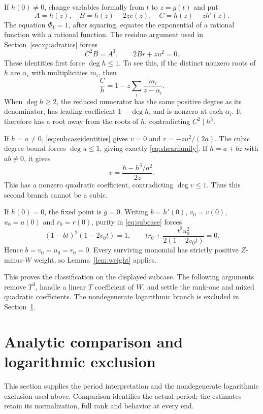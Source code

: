 \documentclass[11pt]{article}
\theoremstyle{definition}\newtheorem{definition}[theorem]{Definition}
\theoremstyle{remark}\newtheorem{remark}[theorem]{Remark}
\begin{document}
If $h(0)\ne0$, change variables formally from $t$ to $z=g(t)$ and put
\[
 A=h(z),\quad B=h(z)-2zv(z),\quad C=h(z)-zh'(z).
\]
The equation $\Phi_1=1$, after squaring, equates the exponential of a
rational function with a rational function. The residue argument used
in Section~\ref{sec:quadratics} forces
\begin{equation}\label{eq:subcaseidentities}
 C^2B=A^3,\qquad 2Br+zu^2=0.
\end{equation}
These identities first force $\deg h\leq1$. To see this, if the distinct
nonzero roots of $h$ are $\alpha_i$ with multiplicities $m_i$, then
\[
 \frac Ch=1-z\sum_i\frac{m_i}{z-\alpha_i}.
\]
When $\deg h\geq2$, the reduced numerator has the same positive degree
as its denominator, has leading coefficient $1-\deg h$, and is nonzero
at each $\alpha_i$. It therefore has a root away from the roots of $h$,
contradicting $C^2\mid h^3$.

If $h=a\ne0$, \eqref{eq:subcaseidentities} gives $v=0$ and
$r=-zu^2/(2a)$. The cubic degree bound forces $\deg u\leq1$, giving
exactly \eqref{eq:shearfamily}. If $h=a+bz$ with $ab\ne0$, it gives
\[
 v=\frac{h-h^3/a^2}{2z}.
\]
This has a nonzero quadratic coefficient, contradicting $\deg v\leq1$.
Thus this second branch cannot be a cubic.

If $h(0)=0$, the fixed point is $g=0$. Writing
$b=h'(0)$, $v_0=v(0)$, $u_0=u(0)$ and $r_0=r(0)$, purity in
\eqref{eq:subcase} forces
\[
 (1-bt)^2(1-2v_0t)=1,\qquad
 tr_0+\frac{t^2u_0^2}{2(1-2v_0t)}=0.
\]
Hence $b=v_0=u_0=r_0=0$. Every surviving monomial has strictly positive
$Z$-minus-$W$ weight, so Lemma~\ref{lem:weight} applies.

This proves the classification on the displayed subcase. The following
arguments remove $T^3$, handle a linear $T$ coefficient of $W$, and
settle the rank-one and mixed quadratic coefficients. The nondegenerate
logarithmic branch is excluded in Section~\ref{sec:analyticcomparison}.







\section{Analytic comparison and logarithmic exclusion}
\label{sec:analyticcomparison}
This section supplies the period interpretation and the nondegenerate
logarithmic exclusion used above. Comparison identifies the actual
period; the estimates retain its normalization, full rank and behavior
at every end.
\end{document}
